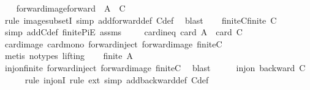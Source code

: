 \begin{isabellebody}
\isanewline
\ \ \isamarkupfalse%
\ forward{\isacharunderscore}{\kern0pt}image{\isacharcolon}{\kern0pt}{\isachardoublequoteopen}forward\ {\isacharbackquote}{\kern0pt}\ {\isacharquery}{\kern0pt}A\ {\isasymsubseteq}\ C{\isachardoublequoteclose}\isanewline
\ \ \ \ \isamarkupfalse%
\ {\isacharparenleft}{\kern0pt}rule\ image{\isacharunderscore}{\kern0pt}subsetI{\isacharcomma}{\kern0pt}\ simp\ add{\isacharcolon}{\kern0pt}forward{\isacharunderscore}{\kern0pt}def\ C{\isacharunderscore}{\kern0pt}def{\isacharparenright}{\kern0pt}\ \isamarkupfalse%
\ blast\isanewline
\ \ \isamarkupfalse%
\ finite{\isacharunderscore}{\kern0pt}C{\isacharcolon}{\kern0pt}{\isachardoublequoteopen}finite\ C{\isachardoublequoteclose}\isanewline
\ \ \ \ \isamarkupfalse%
\ {\isacharparenleft}{\kern0pt}simp\ add{\isacharcolon}{\kern0pt}C{\isacharunderscore}{\kern0pt}def\ finite{\isacharunderscore}{\kern0pt}PiE\ assms{\isacharparenleft}{\kern0pt}{}{\isacharparenright}{\kern0pt}{\isacharparenright}{\kern0pt}\ \isanewline
\isanewline
\ \ \isamarkupfalse%
\ card{\isacharunderscore}{\kern0pt}ineq{\isacharunderscore}{\kern0pt}{}{\isacharcolon}{\kern0pt}\ {\isachardoublequoteopen}card\ {\isacharquery}{\kern0pt}A\ {\isasymle}\ card\ C{\isachardoublequoteclose}\isanewline
\ \ \ \ \isamarkupfalse%
\ card{\isacharunderscore}{\kern0pt}image\ card{\isacharunderscore}{\kern0pt}mono\ forward{\isacharunderscore}{\kern0pt}inject\ forward{\isacharunderscore}{\kern0pt}image\ finite{\isacharunderscore}{\kern0pt}C\ \isamarkupfalse%
\ {\isacharparenleft}{\kern0pt}metis\ {\isacharparenleft}{\kern0pt}no{\isacharunderscore}{\kern0pt}types{\isacharcomma}{\kern0pt}\ lifting{\isacharparenright}{\kern0pt}{\isacharparenright}{\kern0pt}\isanewline
\isanewline
\ \ \isamarkupfalse%
\ {\isachardoublequoteopen}finite\ {\isacharquery}{\kern0pt}A{\isachardoublequoteclose}\isanewline
\ \ \ \ \isamarkupfalse%
\ inj{\isacharunderscore}{\kern0pt}on{\isacharunderscore}{\kern0pt}finite\ forward{\isacharunderscore}{\kern0pt}inject\ forward{\isacharunderscore}{\kern0pt}image\ finite{\isacharunderscore}{\kern0pt}C\ \isamarkupfalse%
\ blast\isanewline
\ \ \isamarkupfalse%
\ \isamarkupfalse%
\ {\isachardoublequoteopen}inj{\isacharunderscore}{\kern0pt}on\ backward\ C{\isachardoublequoteclose}\isanewline
\ \ \ \ \isamarkupfalse%
\ {\isacharparenleft}{\kern0pt}rule\ inj{\isacharunderscore}{\kern0pt}onI{\isacharcomma}{\kern0pt}\ rule\ ext{\isacharcomma}{\kern0pt}\ simp\ add{\isacharcolon}{\kern0pt}backward{\isacharunderscore}{\kern0pt}def\ C{\isacharunderscore}{\kern0pt}def{\isacharparenright}{\kern0pt}\ \isanewline

\end{isabellebody}
